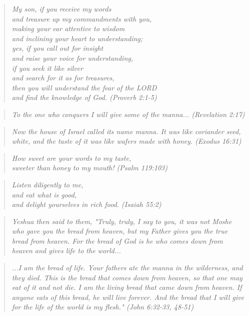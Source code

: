 \documentclass[10pt,oneside,footinclude=true,headinclude=true]{scrbook} %
\newcommand{\textul}[1]{%
  \uline{\phantom{#1}}%
  \llap{\contour{white}{#1}}%
}
\newcommand\quot[1]{
	\begin{quote}\textit{\small#1}\end{quote}
}
\begin{document}
\quot{My son, if you receive my words\\
\hspace*{5mm}and treasure up my commandments with you,\\
making your ear attentive to wisdom\\
\hspace*{5mm}and inclining your heart to understanding;\\
yes, if you call out for insight\\
\hspace*{5mm}and raise your voice for understanding,\\
if you seek it like silver\\
\hspace*{5mm}and search for it as for \textul{hidden} treasures,\\
then you will understand the fear of the LORD\\
\hspace*{5mm}and find the knowledge of God. (Proverb 2:1-5)}

\quot{To the one who conquers I will give some of the \textul{hidden} manna... (Revelation 2:17)}

\quot{Now the house of Israel called its name manna. It was like coriander seed, white, and the taste of it was like wafers made with honey. (Exodus 16:31)}

\quot{How sweet are your words to my taste,\\
\hspace*{5mm}sweeter than honey to my mouth! (Psalm 119:103)}

\quot{Listen diligently to me,\\
\hspace*{5mm}and eat what is good,\\
\hspace*{5mm}and delight yourselves in rich food. (Isaiah 55:2)}

\quot{Yeshua then said to them, "Truly, truly, I say to you, it was not Moshe who gave you the bread from heaven, but my Father gives you the true bread from heaven. For the bread of God is he who comes down from heaven and gives life to the world...}

\quot{...I am the bread of life. Your fathers ate the manna in the wilderness, and they died. This is the bread that comes down from heaven, so that one may eat of it and not die. I am the living bread that came down from heaven. If anyone eats of this bread, he will live forever. And the bread that I will give for the life of the world is my flesh." (John 6:32-33, 48-51)} 
\end{document}
